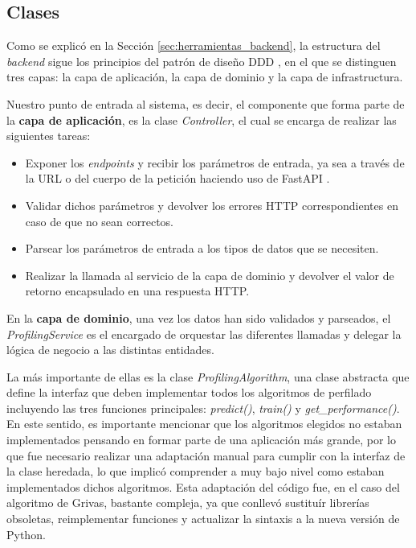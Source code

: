 \subsection{Clases}

\bigskip
Como se explicó en la Sección \ref{sec:herramientas_backend}, la estructura del \textit{backend} sigue los principios
del patrón de diseño DDD \cite{ddd}, en el que se distinguen tres capas: la capa de aplicación, la capa de dominio
y la capa de infrastructura.

\bigskip
Nuestro punto de entrada al sistema, es decir, el componente que forma parte de la \textbf{capa de aplicación}, es la clase
\textit{Controller}, el cual se encarga de realizar las siguientes tareas:

\begin{itemize}
	\item Exponer los \textit{endpoints} y recibir los parámetros de entrada, ya sea a través de la URL o del cuerpo de la petición
	haciendo uso de FastAPI \cite{fastapi}.
	\item Validar dichos parámetros y devolver los errores HTTP correspondientes en caso de que no sean correctos.
	\item Parsear los parámetros de entrada a los tipos de datos que se necesiten.
	\item Realizar la llamada al servicio de la capa de dominio y devolver el valor de retorno encapsulado en una respuesta HTTP.
\end{itemize}

\bigskip
En la \textbf{capa de dominio}, una vez los datos han sido validados y parseados, el \textit{ProfilingService} es el encargado de orquestar
las diferentes llamadas y delegar la lógica de negocio a las distintas entidades.

\bigskip
La más importante de ellas es la clase \textit{ProfilingAlgorithm},
una clase abstracta que define la interfaz que deben implementar todos los algoritmos de perfilado incluyendo las tres funciones principales:
\textit{predict()}, \textit{train()} y \textit{get\_performance()}. En este sentido, es importante mencionar que los algoritmos elegidos no estaban implementados
pensando en formar parte de una aplicación más grande, por lo que fue necesario realizar una adaptación manual para cumplir con la interfaz de
la clase heredada, lo que implicó comprender a muy bajo nivel como estaban implementados dichos algoritmos. Esta adaptación del código fue, en el caso del algoritmo de Grivas, 
bastante compleja, ya que conllevó sustituír librerías obsoletas, reimplementar funciones y actualizar la sintaxis a la nueva versión de Python.

